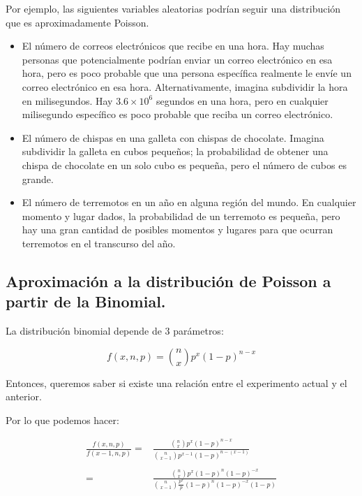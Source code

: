 Por ejemplo, las siguientes variables aleatorias podrían seguir una distribución
que es aproximadamente Poisson.

\begin{itemize}
\item El número de correos electrónicos que recibe en una hora. Hay muchas
personas que potencialmente podrían enviar un correo electrónico en esa hora,
pero es poco probable que una persona específica realmente le envíe un correo
electrónico en esa hora. Alternativamente, imagina subdividir la hora en
milisegundos. Hay $3.6 \times 10^6$ segundos en una hora, pero en cualquier
milisegundo específico es poco probable que reciba un correo electrónico.

\item El número de chispas en una galleta con chispas de chocolate. Imagina
subdividir la galleta en cubos pequeños; la probabilidad de obtener una chispa
de chocolate en un solo cubo es pequeña, pero el número de cubos es grande.

\item El número de terremotos en un año en alguna región del mundo. En cualquier
momento y lugar dados, la probabilidad de un terremoto es pequeña, pero hay una
gran cantidad de posibles momentos y lugares para que ocurran terremotos en el
transcurso del año.

\end{itemize}

\subsection{Aproximación a la distribución de Poisson a partir de la Binomial.}

La distribución binomial depende de 3 parámetros:

  \begin{equation}
    f(x,n,p) = \binom{n}{x} p^x (1-p)^{n-x}
  \end{equation}

Entonces, queremos saber si existe una relación entre el experimento actual y el
anterior.

Por lo que podemos hacer:

\begin{equation}
  \begin{array}{rr}
  \frac{f(x,n,p)}{f(x-1,n,p)} = & \frac{\binom{n}{x} p^x (1-p)^{n-x}}{\binom{n}{x-1} p^{x-1} (1-p)^{n-(x-1)}} \\
  \\

                              = & \frac{\binom{n}{x} p^x (1-p)^{n} (1-p)^{-x}}{\binom{n}{x-1} \frac{p^x}{p} (1-p)^{n}(1-p)^{-x} (1-p)}
  \end{array}
\end{equation}


